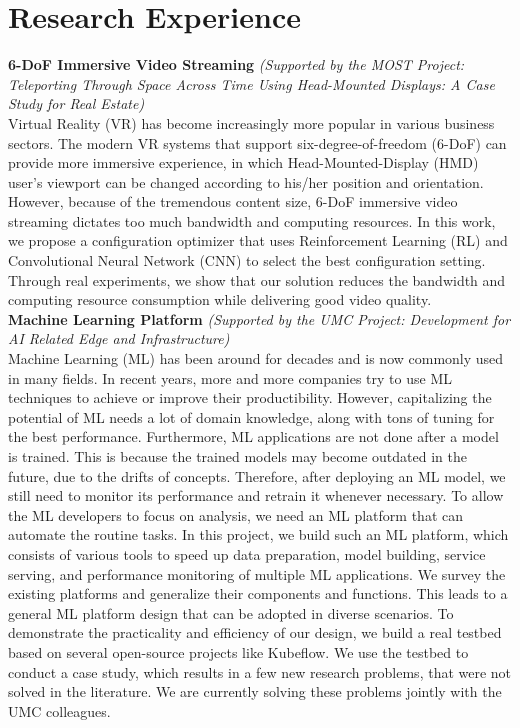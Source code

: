 \section{Research Experience}
{\bf 6-DoF Immersive Video Streaming} {\it (Supported by the MOST Project: Teleporting Through Space Across Time Using Head-Mounted Displays: A Case Study for Real Estate)} \\
Virtual Reality (VR) has become increasingly more popular in various business sectors. 
The modern VR systems that support
six-degree-of-freedom (6-DoF) can provide more immersive experience, in which Head-Mounted-Display (HMD) user’s viewport can be changed
according to his/her position and orientation. However, because of the tremendous content size, 6-DoF immersive
video streaming dictates too much bandwidth and computing resources. In this work, we propose a configuration
optimizer that uses Reinforcement Learning (RL) and Convolutional Neural Network (CNN) to 
select the best configuration setting. Through real experiments, we show that our solution reduces the bandwidth and computing resource consumption while delivering
good video quality.\\

{\bf Machine Learning Platform} {\it (Supported by the UMC Project: Development for AI Related Edge and Infrastructure)}\\
Machine Learning (ML) has been around for decades
and is now commonly used in many fields. 
In recent years, more and more companies try to use ML techniques to achieve or improve their
productibility. However, capitalizing the potential of ML needs a lot of domain knowledge, along with tons of tuning for the best performance.
Furthermore, ML applications are not done after a model is trained. This is because the trained models may become outdated in the future, due to the drifts of concepts. 
Therefore, after deploying an ML model, we still need to monitor its performance and retrain it whenever necessary.
To allow the ML developers to focus on analysis, we need an ML platform that can automate the routine tasks.
In this project, we build such an ML platform, which consists of various tools to speed up data preparation, model building, service serving, and performance monitoring of multiple ML applications.
We survey the existing platforms and generalize their components and functions.
This leads to a general ML platform design that can be adopted in diverse scenarios.
To demonstrate the practicality and efficiency of our design, we build a real testbed based on several open-source projects like Kubeflow.
We use the testbed to conduct a case study, which results in a few new research problems, that were not solved in the literature. We are currently solving these problems jointly with the UMC colleagues. \\

